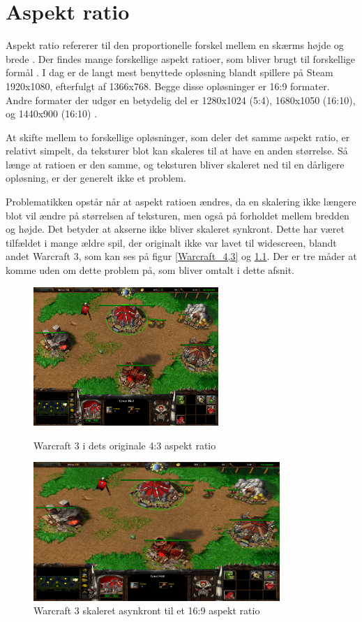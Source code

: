\documentclass[Main.tex]{AspectRatio.tex}
\begin{document}
\chapter{Aspekt ratio}

Aspekt ratio refererer til den proportionelle forskel mellem en skærms højde og brede \cite{Gibson}. Der findes mange forskellige aspekt ratioer, som bliver brugt til forskellige formål \cite{CommonResolutions}. I dag er de langt mest benyttede opløsning blandt spillere på Steam 1920x1080, efterfulgt af 1366x768. Begge disse opløsninger er 16:9 formater. Andre formater der udgør en betydelig del er 1280x1024 (5:4), 1680x1050 (16:10), og 1440x900 (16:10) \cite{Steam}.

At skifte mellem to forskellige opløsninger, som deler det samme aspekt ratio, er relativt simpelt, da teksturer blot kan skaleres til at have en anden størrelse. Så længe at ratioen er den samme, og teksturen bliver skaleret ned til en dårligere opløsning, er der generelt ikke et problem. 

Problematikken opstår når at aspekt ratioen ændres, da en skalering ikke længere blot vil ændre på størrelsen af teksturen, men også på forholdet mellem bredden og højde. Det betyder at akserne ikke bliver skaleret synkront. Dette har været tilfældet i mange ældre spil, der originalt ikke var lavet til widescreen, blandt andet Warcraft 3\cite{Warcraft3Game}, som kan ses på figur \ref{Warcraft_4,3} og \ref{Warcraft_16,9}. \cite{Wills} Der er tre måder at komme uden om dette problem på, som bliver omtalt i dette afsnit.

\begin{figure}[h]
\centering
\parbox{7cm}{   
\includegraphics[width = 7cm]{billeder/Warcraft_4,3}
\caption{Warcraft 3 i dets originale 4:3 aspekt ratio}    
\label{Warcraft_4,3}}
\qquad
\begin{minipage}{9.33cm}
\includegraphics[width = 9.33cm]{billeder/Warcraft_16,9}
\caption{Warcraft 3 skaleret asynkront til et 16:9 aspekt ratio}    
\label{Warcraft_16,9}
\end{minipage}
\end{figure}
\end{document}
